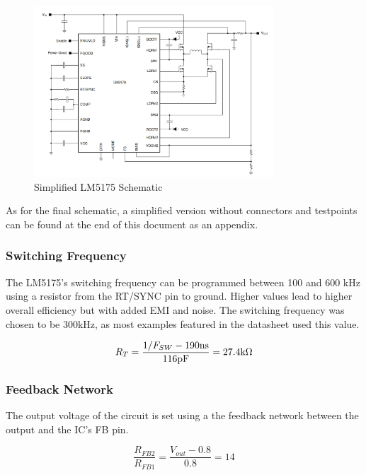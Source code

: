 \documentclass[11pt, a4paper]{article}
\begin{document}
\begin{figure}[H]
    \centering
    \includegraphics[width=0.8\textwidth]{figures/exampleSchematic.png}
    \caption{Simplified LM5175 Schematic}
    \label{fig:exampleSchem}
\end{figure}

As for the final schematic, a simplified version without connectors and testpoints can be found at the end of this document as an appendix.

\subsubsection{Switching Frequency}

The LM5175's switching frequency can be programmed between 100 and 600 kHz using a resistor from the RT/SYNC pin to ground. Higher values lead to higher overall efficiency but with added EMI and noise. The switching frequency was chosen to be 300kHz, as most examples featured in the datasheet used this value.

\begin{equation}
    R_T = \frac{1/F_{SW}-190\text{ns}}{116\text{pF}} = 27.4 \text k \Omega
\end{equation}

\subsubsection{Feedback Network}

The output voltage of the circuit is set using a the feedback network between the output and the IC's FB pin. 

\begin{equation}
    \frac{R_{FB2}}{R_{FB1}} = \frac{V_{out}-0.8}{0.8} = 14
\end{equation}
\end{document}
